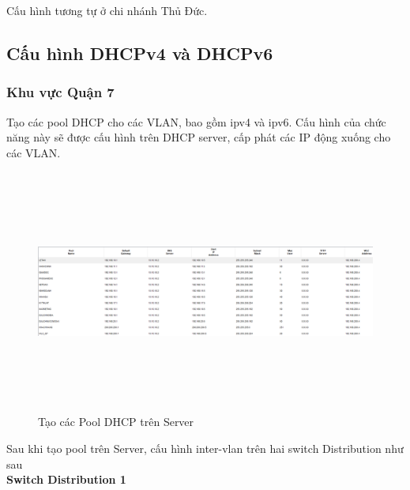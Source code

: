\documentclass[a4paper, 12pt]{article}
\begin{document}
\hspace*{0.25cm}Cấu hình tương tự ở chi nhánh Thủ Đức.
\subsection{Cấu hình DHCPv4 và DHCPv6}
\subsubsection{Khu vực Quận 7}
\hspace*{0.25cm}Tạo các pool DHCP cho các VLAN, bao gồm ipv4 và ipv6. Cấu hình của chức năng này sẽ được cấu hình trên DHCP server, cấp phát các IP động xuống cho các VLAN.\\
\begin{figure}[H]
    \centering
    \includegraphics[width=16cm, height=8cm]{img/471.png}
    \caption{Tạo các Pool DHCP trên Server}
    \label{hinh471}
\end{figure}
\hspace*{0.25cm}Sau khi tạo pool trên Server, cấu hình inter-vlan trên hai switch Distribution như sau\\
\hspace*{1cm}\textbf{Switch Distribution 1}\\
\end{document}
